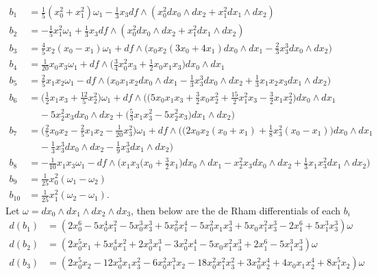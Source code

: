 \documentclass[10pt,oneside,reqno]{amsart}
\begin{document}
\begin{flushleft}
		\newpage
		
		\begin{align*}
			b_1 & =\frac{1}{5}(x_0^2+x_1^2)\omega_1-\frac{1}{3}x_3df\wedge(x_0^2dx_0\wedge dx_2+x_1^2dx_1\wedge dx_2) \\
			b_2 & =-\frac{1}{5}x_1^2\omega_1+\frac{1}{3}x_3df\wedge(x_0^2dx_0\wedge dx_2+x_1^2dx_1\wedge dx_2) \\
			b_3 & =\frac{4}{5}x_2(x_0-x_1)\omega_1+df\wedge\Bigg(x_0x_2(3x_0+4x_1)dx_0\wedge dx_1-\frac{2}{3}x_3^3dx_0\wedge dx_2\Bigg) \\
			b_4 & =\frac{1}{20}x_0x_3\omega_1+df\wedge\Bigg(\frac{3}{4}x_0^2x_3+\frac{1}{2}x_0x_1x_3\Bigg)dx_0\wedge dx_1 \\
			b_5 & =\frac{2}{5}x_1x_2\omega_1-df\wedge\Bigg(x_0x_1x_2dx_0\wedge dx_1-\frac{1}{3}x_3^3dx_0\wedge dx_2+\frac{1}{3}x_1x_2x_3dx_1\wedge dx_2\Bigg) \\
			b_6 & =\Bigg(\frac{1}{2}x_1x_3+\frac{12}{5}x_2^2\Bigg)\omega_1+df\wedge\Bigg(\Bigg(5x_0x_1x_3+\frac{3}{2}x_0x_2^2+\frac{15}{2}x_1^2x_3-\frac{3}{2}x_1x_2^2\Bigg)dx_0\wedge dx_1 \\
			& \;\;\;\;-5x_2^2x_3dx_0\wedge dx_2+\Bigg(\frac{5}{3}x_1x_3^2-5x_2^2x_3\Bigg)dx_1\wedge dx_2\Bigg) \\
			b_7 & =\Bigg(\frac{2}{5}x_0x_2-\frac{2}{5}x_1x_2-\frac{1}{20}x_3^2\Bigg)\omega_1+df\wedge\Bigg(\Bigg(2x_0x_2(x_0+x_1)+\frac{1}{8}x_3^2(x_0-x_1)\Bigg)dx_0\wedge dx_1 \\
			& \;\;\;\;-\frac{1}{3}x_3^3dx_0\wedge dx_2-\frac{1}{9}x_3^3dx_1\wedge dx_2\Bigg) \\
			b_8 & =-\frac{1}{10}x_1x_3\omega_1-df\wedge\Bigg(x_1x_3\Bigg(x_0+\frac{3}{2}x_1\Bigg)dx_0\wedge dx_1-x_2^2x_3dx_0\wedge dx_2+\frac{1}{3}x_1x_3^2dx_1\wedge dx_2\Bigg) \\
			b_9 & =\frac{1}{25}x_0^2(\omega_1-\omega_2) \\
			b_{10} & =\frac{1}{25}x_1^2(\omega_2-\omega_1).
		\end{align*}
		Let $\omega=dx_0\wedge dx_1\wedge dx_2\wedge dx_3$, then below are the de Rham differentials of each $b_i$
		\begin{align*}
			d(b_1) & =(2x_0^6-5x_0^4x_1^2-5x_0^3x_3^3+5x_0^2x_1^4-5x_0^2x_1x_3^3+5x_0x_1^2x_3^3-2x_1^6+5x_1^3x_3^3)\omega \\
			d(b_2) & =(2x_0^5x_1+5x_0^4x_1^2+2x_0^3x_1^3-3x_0^2x_1^4-5x_0x_1^2x_3^3+2x_1^6-5x_1^3x_3^3)\omega \\
			d(b_3) & =(2x_0^5x_2-12x_0^3x_1x_3^2-6x_0^2x_1^3x_2-18x_0^2x_1^2x_3^2+3x_0^2x_2^4+4x_0x_1x_2^4+8x_1^5x_2)\omega \\

\end{align*}
\end{flushleft}
\end{document}
